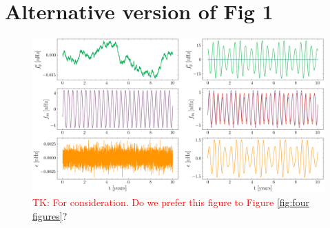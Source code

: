\documentclass[fleqn,usenatbib,useAMS]{mnras}
\begin{document}
\section{Alternative version of Fig 1}





\begin{figure}
	\centering
	\includegraphics[width=\textwidth]{images/Kalman_example_both}
	\caption{\textcolor{red}{TK: For consideration. Do we prefer this figure to Figure \ref{fig:four figures}}?}
	\label{fig:kalmanexampleboth}
\end{figure}
\end{document}
